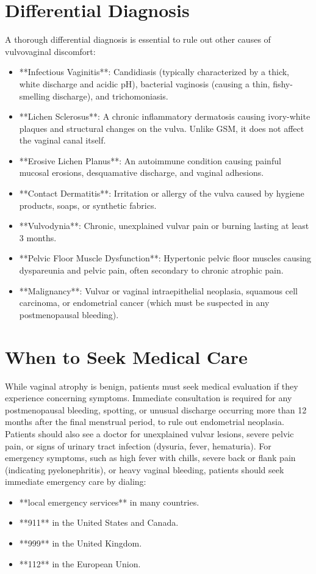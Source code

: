 \section*{Differential Diagnosis}
A thorough differential diagnosis is essential to rule out other causes of vulvovaginal discomfort:
\begin{itemize}
\item **Infectious Vaginitis**: Candidiasis (typically characterized by a thick, white discharge and acidic pH), bacterial vaginosis (causing a thin, fishy-smelling discharge), and trichomoniasis.
\item **Lichen Sclerosus**: A chronic inflammatory dermatosis causing ivory-white plaques and structural changes on the vulva. Unlike GSM, it does not affect the vaginal canal itself.
\item **Erosive Lichen Planus**: An autoimmune condition causing painful mucosal erosions, desquamative discharge, and vaginal adhesions.
\item **Contact Dermatitis**: Irritation or allergy of the vulva caused by hygiene products, soaps, or synthetic fabrics.
\item **Vulvodynia**: Chronic, unexplained vulvar pain or burning lasting at least 3 months.
\item **Pelvic Floor Muscle Dysfunction**: Hypertonic pelvic floor muscles causing dyspareunia and pelvic pain, often secondary to chronic atrophic pain.
\item **Malignancy**: Vulvar or vaginal intraepithelial neoplasia, squamous cell carcinoma, or endometrial cancer (which must be suspected in any postmenopausal bleeding).
\end{itemize}

\section*{When to Seek Medical Care}
While vaginal atrophy is benign, patients must seek medical evaluation if they experience concerning symptoms. Immediate consultation is required for any postmenopausal bleeding, spotting, or unusual discharge occurring more than 12 months after the final menstrual period, to rule out endometrial neoplasia. Patients should also see a doctor for unexplained vulvar lesions, severe pelvic pain, or signs of urinary tract infection (dysuria, fever, hematuria).
For emergency symptoms, such as high fever with chills, severe back or flank pain (indicating pyelonephritis), or heavy vaginal bleeding, patients should seek immediate emergency care by dialing:
\begin{itemize}
\item **local emergency services** in many countries.
\item **911** in the United States and Canada.
\item **999** in the United Kingdom.
\item **112** in the European Union.
\end{itemize}

